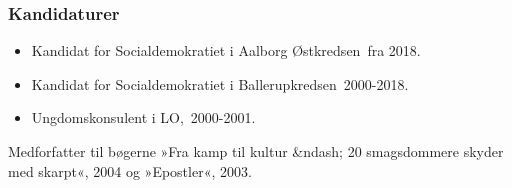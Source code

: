\documentclass[11pt, a4paper]{awesome-cv}
\begin{document}
\begin{cvletter}
\subsubsection*{Kandidaturer}
\begin{itemize}
\item Kandidat for Socialdemokratiet i Aalborg Østkredsen fra 2018.
\item Kandidat for Socialdemokratiet i Ballerupkredsen 2000-2018.
\end{itemize}
\begin{itemize}
\item Ungdomskonsulent i LO, 2000-2001.
\end{itemize}
Medforfatter til bøgerne »Fra kamp til kultur &ndash; 20 smagsdommere skyder med skarpt«, 2004 og »Epostler«, 2003. 

\end{cvletter}
\end{document}
